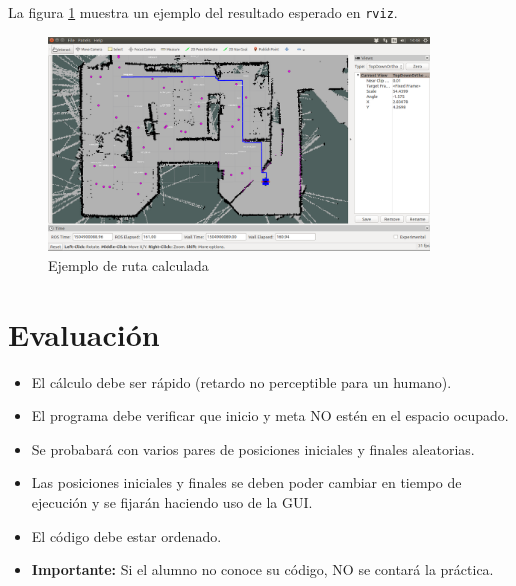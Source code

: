\documentclass[letterpaper,12pt]{article}
\begin{document}
La figura \ref{fig:path} muestra un ejemplo del resultado esperado en \texttt{rviz}.
\begin{figure}
\centering
\includegraphics[width=0.9\textwidth]{Figures/Path.png}
\caption{Ejemplo de ruta calculada}
\label{fig:path}
\end{figure}

\section{Evaluación}
\begin{itemize}
\item El cálculo debe ser rápido (retardo no perceptible para un humano). 
\item El programa debe verificar que  inicio y meta NO estén en el espacio ocupado.
\item Se probabará con varios pares de posiciones iniciales y finales aleatorias.
\item Las posiciones iniciales y finales se deben poder cambiar en tiempo de ejecución y se fijarán haciendo uso de la GUI.
\item El código debe estar ordenado.
\item \textbf{Importante: } Si el alumno no conoce su código, NO se contará la práctica.
\end{itemize}
\end{document}
